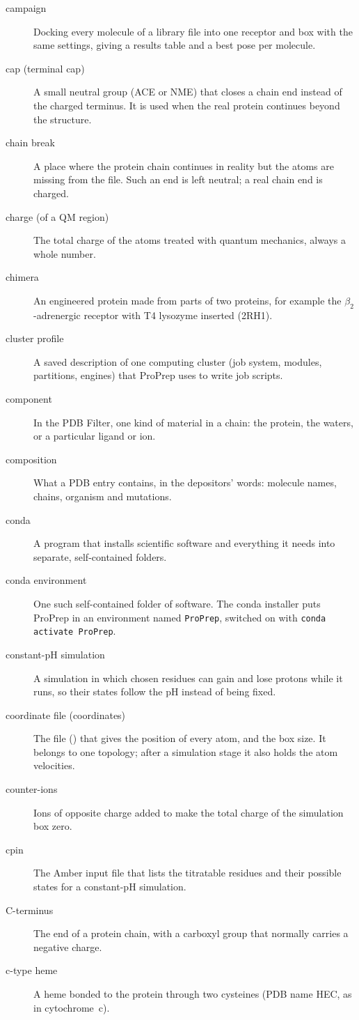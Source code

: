 \begin{description}
\item[campaign] Docking every molecule of a library file into one receptor and
  box with the same settings, giving a results table and a best pose per
  molecule.
\item[cap (terminal cap)] A small neutral group (ACE or NME) that closes a
  chain end instead of the charged terminus. It is used when the real protein
  continues beyond the structure.
\item[chain break] A place where the protein chain continues in reality but
  the atoms are missing from the file. Such an end is left neutral; a real
  chain end is charged.
\item[charge (of a QM region)] The total charge of the atoms treated with
  quantum mechanics, always a whole number.
\item[chimera] An engineered protein made from parts of two proteins, for
  example the $\beta_2$-adrenergic receptor with T4 lysozyme
  inserted (2RH1).
\item[cluster profile] A saved description of one computing cluster (job
  system, modules, partitions, engines) that ProPrep uses to write job
  scripts.
\item[component] In the PDB Filter, one kind of material in a chain: the
  protein, the waters, or a particular ligand or ion.
\item[composition] What a PDB entry contains, in the depositors' words:
  molecule names, chains, organism and mutations.
\item[conda] A program that installs scientific software and everything it
  needs into separate, self-contained folders.
\item[conda environment] One such self-contained folder of software. The conda
  installer puts ProPrep in an environment named \texttt{ProPrep}, switched on
  with \texttt{conda activate ProPrep}.
\item[constant-pH simulation] A simulation in which chosen residues can gain
  and lose protons while it runs, so their states follow the pH instead of
  being fixed.
\item[coordinate file (coordinates)] The file () that gives the
  position of every atom, and the box size. It belongs to one topology; after
  a simulation stage it also holds the atom velocities.
\item[counter-ions] Ions of opposite charge added to make the total charge of
  the simulation box zero.
\item[cpin] The Amber input file that lists the titratable residues and their
  possible states for a constant-pH simulation.
\item[C-terminus] The end of a protein chain, with a carboxyl group that
  normally carries a negative charge.
\item[c-type heme] A heme bonded to the protein through two cysteines (PDB
  name HEC, as in cytochrome~c).
\end{description}

